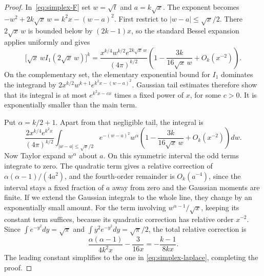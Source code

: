 \begin{proof}
In~\eqref{eq:simplex-F} set $w=\sqrt t$ and $a=k\sqrt x$.
The exponent becomes $-w^2+2k\sqrt x\,w=k^2x-(w-a)^2$.
First restrict to $|w-a|\le\sqrt x/2$. There $2\sqrt x\,w$ is bounded
below by $(2k-1)x$, so the standard Bessel expansion
\cite[Eq.~10.40.1]{dlmf} applies uniformly and gives
\[
\bigl[\sqrt x\,w I_1(2\sqrt x\,w)\bigr]^k
=\frac{x^{k/4}w^{k/2}e^{2k\sqrt x\,w}}{(4\pi)^{k/2}}
\left(1-\frac{3k}{16\sqrt x\,w}+O_k(x^{-2})\right).
\]
On the complementary set, the elementary exponential bound for $I_1$
dominates the integrand by
$2x^{k/2}w^{k+1}e^{k^2x-(w-a)^2}$.
Gaussian tail estimates therefore show that its integral is at most
$e^{k^2x-cx}$ times a fixed power of $x$, for some $c>0$.
It is exponentially smaller than the main term.

Put $\alpha=k/2+1$. Apart from that negligible tail, the integral is
\[
\frac{2x^{k/4}e^{k^2x}}{(4\pi)^{k/2}}
\int_{|w-a|\le\sqrt x/2} e^{-(w-a)^2}w^\alpha
\left(1-\frac{3k}{16\sqrt x\,w}+O_k(x^{-2})\right)dw.
\]
Now Taylor expand $w^\alpha$ about $a$. On this symmetric interval the odd
terms integrate to zero. The quadratic term gives a relative correction of
$\alpha(\alpha-1)/(4a^2)$, and the fourth-order remainder is $O_k(a^{-4})$,
since the interval stays a fixed fraction of $a$ away from zero and the
Gaussian moments are finite. If we extend the Gaussian integrals to the whole
line, they change by an exponentially small amount.
For the term involving $w^{\alpha-1}/\sqrt x$, keeping its constant term
suffices, because its quadratic correction has relative order $x^{-2}$.
Since $\int e^{-y^2}dy=\sqrt\pi$ and
$\int y^2e^{-y^2}dy=\sqrt\pi/2$, the total relative correction is
\[
\frac{\alpha(\alpha-1)}{4k^2x}-\frac3{16x}
=-\frac{k-1}{8kx}.
\]
The leading constant simplifies to the one in
\eqref{eq:simplex-laplace}, completing the proof.
\end{proof}

